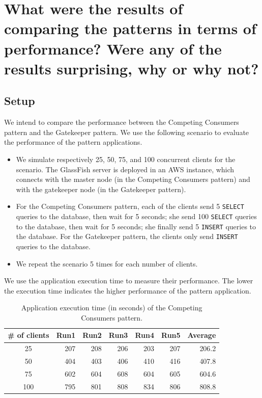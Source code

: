 \documentclass{article}
\begin{document}
\section{What were the results of comparing the patterns in terms of performance? Were any of the results surprising, why or why not?}\label{Q5}

\subsection{Setup}
We intend to compare the performance between the Competing Consumers pattern and the Gatekeeper pattern. We use the following scenario to evaluate the performance of the pattern applications. 

\begin{itemize}
\item We simulate respectively 25, 50, 75, and 100 concurrent clients for the scenario. The GlassFish server is deployed in an AWS instance, which connects with the master node (in the Competing Consumers pattern) and with the gatekeeper node (in the Gatekeeper pattern).
\item For the Competing Consumers pattern, each of the clients send 5 \texttt{SELECT} queries to the database, then wait for 5 seconds; she send 100 \texttt{SELECT} queries to the database, then wait for 5 seconds; she finally send 5 \texttt{INSERT} queries to the database. For the Gatekeeper pattern, the clients only send \texttt{INSERT} queries to the database.
\item We repeat the scenario 5 times for each number of clients.
\end{itemize}

We use the application execution time to measure their performance. The lower the execution time indicates the higher performance of the pattern application.


\begin{table}[t]
    \centering
    \caption{Application execution time (in seconds) of the Competing Consumers pattern.}
    \label{tab:ccp_performance}
    \begin{tabular}{|c|r|r|r|r|r|r|}
        \hline
        \textbf{\# of clients} & \textbf{Run1} & \textbf{Run2} & \textbf{Run3} & \textbf{Run4} & \textbf{Run5} & \textbf{Average}\\ \hline
        25 & 207 & 208 & 206 & 203 & 207 & 206.2 \\ \hline 
        50 & 404 & 403 & 406 & 410 & 416 & 407.8 \\ \hline
        75 & 602 & 604 & 608 & 604 & 605 & 604.6 \\ \hline
        100 & 795 & 801 & 808 & 834 & 806 & 808.8 \\ \hline
	\end{tabular}
\end{table}
\end{document}
